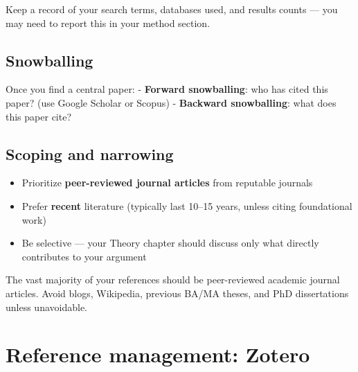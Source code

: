 \documentclass[
  11pt,
  a4paper,
]{scrbook}
\providecommand{\tightlist}{%
  \setlength{\itemsep}{0pt}\setlength{\parskip}{0pt}}\usepackage{longtable,booktabs,array}
\begin{document}
Keep a record of your search terms, databases used, and results counts
--- you may need to report this in your method section.

\subsection{Snowballing}\label{snowballing}

Once you find a central paper: - \textbf{Forward snowballing}: who has
cited this paper? (use Google Scholar or Scopus) - \textbf{Backward
snowballing}: what does this paper cite?

\subsection{Scoping and narrowing}\label{scoping-and-narrowing}

\begin{itemize}
\tightlist
\item
  Prioritize \textbf{peer-reviewed journal articles} from reputable
  journals
\item
  Prefer \textbf{recent} literature (typically last 10--15 years, unless
  citing foundational work)
\item
  Be selective --- your Theory chapter should discuss only what directly
  contributes to your argument
\end{itemize}

\begin{tcolorbox}[enhanced jigsaw, bottomrule=.15mm, opacityback=0, toprule=.15mm, colframe=quarto-callout-warning-color-frame, left=2mm, rightrule=.15mm, title=\textcolor{quarto-callout-warning-color}{\faExclamationTriangle}\hspace{0.5em}{Quality over quantity}, colbacktitle=quarto-callout-warning-color!10!white, bottomtitle=1mm, colback=white, breakable, toptitle=1mm, titlerule=0mm, leftrule=.75mm, arc=.35mm, opacitybacktitle=0.6, coltitle=black]

The vast majority of your references should be peer-reviewed academic
journal articles. Avoid blogs, Wikipedia, previous BA/MA theses, and PhD
dissertations unless unavoidable.

\end{tcolorbox}

\section{Reference management:
Zotero}\label{reference-management-zotero}
\end{document}
